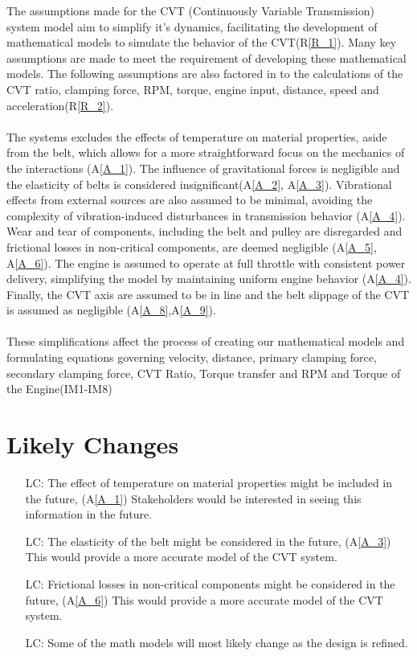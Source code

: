 \documentclass[12pt]{article}
\newcommand{\aref}[1]{A\ref{#1}}
\newcommand{\rref}[1]{R\ref{#1}}
\newcounter{lcnum} %
\begin{document}
The assumptions made for the CVT (Continuously Variable Transmission) system model aim to simplify it's dynamics, facilitating the development of mathematical models to simulate the behavior of the CVT(\rref{R_1}). 
Many key assumptions are made to meet the requirement of developing these mathematical models. The following assumptions are also factored in to the calculations of the CVT ratio, clamping force, RPM, torque, engine input, distance, speed and acceleration(\rref{R_2}). 
\\\\
\noindent The systems excludes the effects of temperature on material properties, aside from the belt, which allows for a more straightforward focus on the mechanics of the interactions (\aref{A_1}).
The influence of gravitational forces is negligible and the elasticity of belts is considered insignificant(\aref{A_2}, \aref{A_3}). 
Vibrational effects from external sources are also assumed to be minimal, avoiding the complexity of vibration-induced disturbances in transmission behavior (\aref{A_4}).
Wear and tear of components, including the belt and pulley are disregarded and frictional losses in non-critical components, are deemed negligible (\aref{A_5}, \aref{A_6}). 
The engine is assumed to operate at full throttle with consistent power delivery, simplifying the model by maintaining uniform engine behavior (\aref{A_4}).
Finally, the CVT axis are assumed to be in line and the belt slippage of the CVT is assumed as negligible (\aref{A_8},\aref{A_9}). 
\\\\
\noindent These simplifications affect the process of creating our mathematical models and formulating equations governing velocity, distance, primary clamping force, secondary clamping force, CVT Ratio, Torque transfer and RPM and Torque of the Engine(IM1-IM8)

\section{Likely Changes}    

\noindent \begin{itemize}

\item[LC\refstepcounter{lcnum}\thelcnum\label{LC_1}:] The effect of temperature on material properties might be included in the future, (A\ref{A_1}) Stakeholders would be interested in seeing this information in the future.
\item[LC\refstepcounter{lcnum}\thelcnum\label{LC_2}:] The elasticity of the belt might be considered in the future, (A\ref{A_3}) This would provide a more accurate model of the CVT system.
\item[LC\refstepcounter{lcnum}\thelcnum\label{LC_3}:] Frictional losses in non-critical components might be considered in the future, (A\ref{A_6}) This would provide a more accurate model of the CVT system.
\item[LC\refstepcounter{lcnum}\thelcnum\label{LC_4}:] Some of the math models will most likely change as the design is refined.

\end{itemize}
\end{document}
